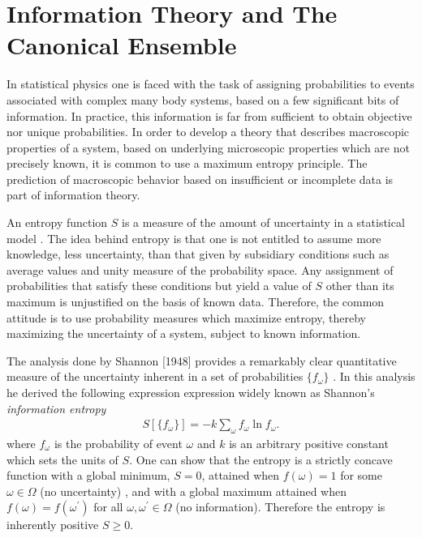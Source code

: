 \documentclass[english,12pt]{ttuthes}
\begin{document}
\section{Information Theory and The Canonical Ensemble}
\label{sec:Information_Theory} 
%
In statistical physics one is faced with the task of assigning
probabilities to events associated with complex many body systems,
based on a few significant bits of information. In practice, this
information is far from sufficient to obtain objective nor unique
probabilities. In order to develop a theory that describes macroscopic 
properties of a system, based on underlying microscopic properties
which are not precisely known, it is common to use a maximum entropy
principle. The prediction of macroscopic behavior
based on insufficient or incomplete data is part of information theory. 

An entropy function $S$ is a measure of the amount of uncertainty in a
statistical model \cite{Robertson-1993}. The idea behind entropy is
that one is not entitled to assume more knowledge, less uncertainty,
than that given by subsidiary conditions such as average values and
unity measure of the probability space. Any assignment of 
probabilities that satisfy these conditions but yield a value of $S$
other than its maximum is unjustified on the basis of known
data. Therefore, the common attitude is to use probability
measures which maximize entropy, thereby maximizing the
uncertainty of a system, subject to known information. 

The analysis done by Shannon [1948] provides a remarkably clear
quantitative measure of the uncertainty inherent in a set of
probabilities $\{f_\omega\}$ \cite{Robertson-1993,Balian:NCB:471}. In this
analysis he derived the following expression expression widely known
as Shannon's \emph{information entropy}
%
\begin{align} \label{eq:ShannonEntropy}
  S[\{f_\omega\}]=-k\sum_\omega f_\omega\ln{f_\omega}.
\end{align}
%
where $f_\omega$ is the probability of event $\omega$ and $k$ is an arbitrary
positive constant which sets the units of $S$. One can show that the
entropy is a strictly concave function \cite{Sethna-2006} with a
global minimum, $S=0$, attained when $f(\omega)=1$ for some $\omega\in\Omega$ (no
uncertainty) \cite{Robertson-1993}, and with a global maximum attained when
$f(\omega)=f(\omega^\prime)$ for all $\omega,\omega^\prime\in\Omega$ (no
information)\cite{Sethna-2006,Firas}. Therefore the entropy is
inherently positive $S\geq0$.    
\end{document}
